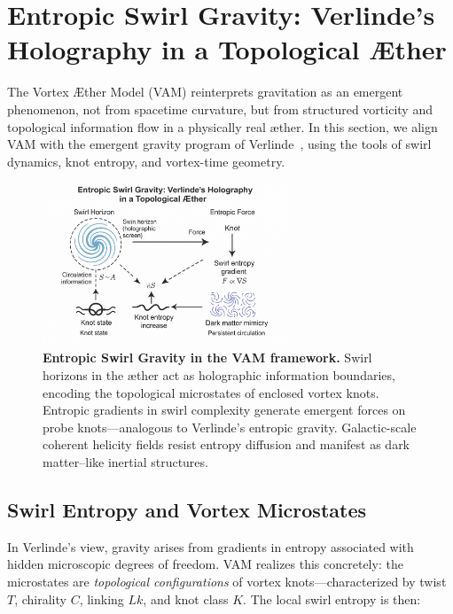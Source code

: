 \section{Entropic Swirl Gravity: Verlinde's Holography in a Topological Æther}

The Vortex \AE{}ther Model (VAM) reinterprets gravitation as an emergent phenomenon, not from spacetime curvature, but from structured vorticity and topological information flow in a physically real æther. In this section, we align VAM with the emergent gravity program of Verlinde~\cite{Verlinde2011, Verlinde2016, verlinde2017emergent}, using the tools of swirl dynamics, knot entropy, and vortex-time geometry.

\begin{figure}[h!]
\centering
\includegraphics[width=0.65\textwidth]{images/ErikVerlinde}
\caption{%
\textbf{Entropic Swirl Gravity in the VAM framework.}
Swirl horizons in the æther act as holographic information boundaries, encoding the topological microstates of enclosed vortex knots. Entropic gradients in swirl complexity generate emergent forces on probe knots—analogous to Verlinde's entropic gravity. Galactic-scale coherent helicity fields resist entropy diffusion and manifest as dark matter–like inertial structures.
}
\end{figure}

\subsection*{Swirl Entropy and Vortex Microstates}

In Verlinde’s view, gravity arises from gradients in entropy associated with hidden microscopic degrees of freedom. VAM realizes this concretely: the microstates are \emph{topological configurations} of vortex knots—characterized by twist \( T \), chirality \( C \), linking \( Lk \), and knot class \( K \). The local swirl entropy is then:

